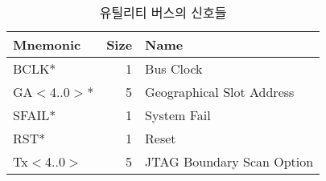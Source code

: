%
%
\begin{table}[htbp]
\caption{유틸리티 버스의 신호들}\label{table:ub-signal}
   \begin{center}
   \begin{tabular}{|l|r|l|} \hline
	Mnemonic & Size & Name \\
\hline \hline
	BCLK*		& 1 & Bus Clock \\
	GA$<$4..0$>$*   & 5 & Geographical Slot Address \\
	SFAIL*          & 1 & System Fail \\
	RST*            & 1 & Reset \\
	Tx$<$4..0$>$	& 5 & JTAG Boundary Scan Option \\ \hline
   \end{tabular}
   \end{center}
\end{table}
%
%
